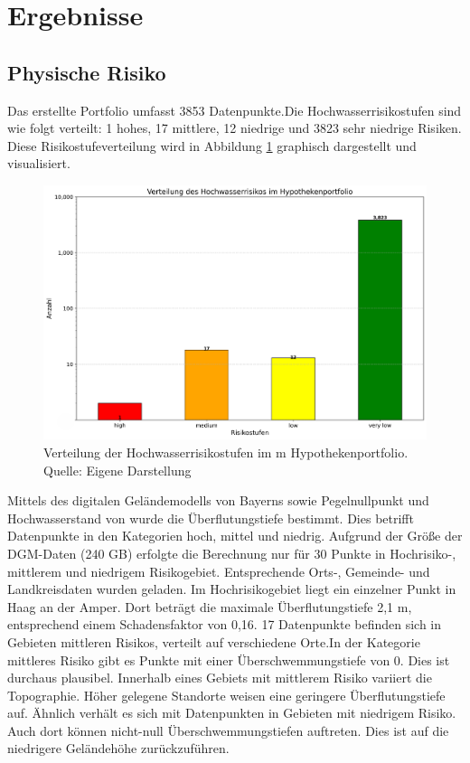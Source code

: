 \section{Ergebnisse}
\subsection{Physische Risiko}
Das erstellte Portfolio umfasst 3853 Datenpunkte.Die Hochwasserrisikostufen sind wie folgt verteilt: 1 hohes, 17 mittlere, 12 niedrige und 3823 sehr niedrige Risiken. Diese Risikostufeverteilung wird in Abbildung \ref{fig:riskostufe} graphisch dargestellt und visualisiert.
\begin{figure}[htbp]
    \centering
    \includegraphics[width=\textwidth]{figures/hochwasserrisiko_verteilung.png}
    \caption{Verteilung der Hochwasserrisikostufen im m Hypothekenportfolio. Quelle: Eigene Darstellung}
    \label{fig:riskostufe}
\end{figure}
\FloatBarrier
Mittels des digitalen Geländemodells von Bayerns sowie Pegelnullpunkt und Hochwasserstand von \textcite{bayern2016hochwassernachrichtendienst} wurde die Überflutungstiefe bestimmt. Dies betrifft Datenpunkte in den Kategorien hoch, mittel und niedrig.
Aufgrund der Größe der \ac{DGM}-Daten (240 GB) erfolgte die Berechnung nur für 30 Punkte in Hochrisiko-, mittlerem und niedrigem Risikogebiet. Entsprechende Orts-, Gemeinde- und Landkreisdaten wurden geladen.
Im Hochrisikogebiet liegt ein einzelner Punkt in Haag an der Amper. Dort beträgt die maximale Überflutungstiefe 2,1 m, entsprechend einem Schadensfaktor von 0,16.
17 Datenpunkte befinden sich in Gebieten mittleren Risikos, verteilt auf verschiedene Orte.In der Kategorie mittleres Risiko gibt es Punkte mit einer Überschwemmungstiefe von 0. Dies ist durchaus plausibel. Innerhalb eines Gebiets mit mittlerem Risiko variiert die Topographie. Höher gelegene Standorte weisen eine geringere Überflutungstiefe auf. Ähnlich verhält es sich mit Datenpunkten in Gebieten mit niedrigem Risiko. Auch dort können nicht-null Überschwemmungstiefen auftreten. Dies ist auf die niedrigere Geländehöhe zurückzuführen. 

